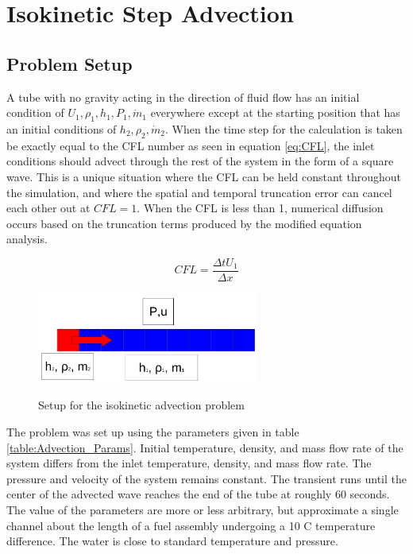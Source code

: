 \vspace*{-80mm}
\chapter{Isokinetic Step Advection} \label{chapter4:Isokinetic_Step_Advection}
 
	\section{Problem Setup} \label{Verification:Advection}
    
    A tube with no gravity acting in the direction of fluid flow has an initial
    condition of $U_{1},\rho_{1},h_{1},P_{1},\dot{m}_{1}$ everywhere except at the 
    starting position that has an initial conditions of $h_{2},\rho_{2},\dot{m}_{2}$. 
    When the time step for the calculation is taken be exactly equal to the CFL
    number as seen in equation \ref{eq:CFL}, the inlet conditions should advect
    through the rest of the system in the form of a square wave. This is a
    unique situation where the CFL can be held constant throughout the
    simulation, and where the spatial and temporal truncation error can cancel
    each other out at $CFL=1$. When the CFL is less than 1, numerical
    diffusion occurs based on the truncation terms produced by the modified
    equation analysis.
    
    \begin{equation}
    	\label{eq:CFL}
    	CFL = \frac{\Delta t  U_{1} }{\Delta x}
    \end{equation}
    
    \begin{figure}[!h]
    	\centering
    	\includegraphics[width=0.65\textwidth]{images/Verification_Problem1_advection}
    	\label{fig:Verification_1}
    	\caption{Setup for the isokinetic advection problem}
    \end{figure}
    
    The problem was set up using the parameters given in table
    \ref{table:Advection_Params}. Initial temperature, density, and mass flow
    rate of the system differs from the inlet temperature, density, and mass
    flow rate. The pressure and velocity of the system remains constant. The
    transient runs until the center of the advected wave reaches the end of the
    tube at roughly 60 seconds. The value of the parameters are more or less
    arbitrary, but approximate a single channel about the length of a fuel
    assembly undergoing a 10 C temperature difference. The water is close to
    standard temperature and pressure. 
    
